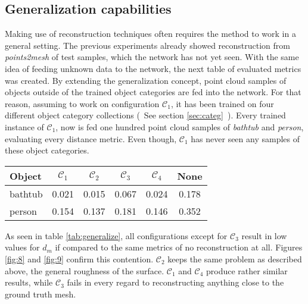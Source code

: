 \subsection{Generalization capabilities}
    Making use of reconstruction techniques often requires the method to work in a general setting.
    The previous experiments already showed reconstruction from \emph{points2mesh} of test samples,
    which the network has not yet seen. With the same idea of feeding unknown data to the network,
    the next table of evaluated metrics was created. By extending the generalization concept, 
    point cloud samples of objects outside of the trained object categories are fed into the network.
    For that reason, assuming to work on configuration $\mathcal{C}_1$, it has been trained on four different
    object category collections (~See section \ref{sec:categ}~).
    Every trained instance of $\mathcal{C}_1$, now is fed one hundred point cloud samples 
    of \emph{bathtub} and \emph{person}, evaluating every distance metric. Even though, $\mathcal{C}_1$ has never seen any samples of these object categories.


\begin{center}
     \label{tab:generalize} 
    \begin{center}
        \begin{tabular}{| l  | c | c | c | c || c |}
            \hline
            Object& $\mathcal{C}_1$ & $\mathcal{C}_2$ & $\mathcal{C}_3$ & $\mathcal{C}_4$ & None\\ \hline
            bathtub&0.021&0.015&0.067&0.024 & 0.178\\\hline
            person&0.154&0.137&0.181&0.146 & 0.352\\\hline
        \end{tabular}
    \end{center}
\end{center}

    As seen in table \ref{tab:generalize}, all configurations except for $\mathcal{C}_3$ result in low values for $d_m$ if
    compared to the same metrics of no reconstruction at all. Figures \ref{fig:8} and \ref{fig:9} confirm this contention.
    $\mathcal{C}_2$ keeps the same problem as described above, the general roughness of the surface. $\mathcal{C}_1$ and
    $\mathcal{C}_4$ produce rather similar results, while $\mathcal{C}_3$ fails in every regard to reconstructing anything
    close to the ground truth mesh. 

